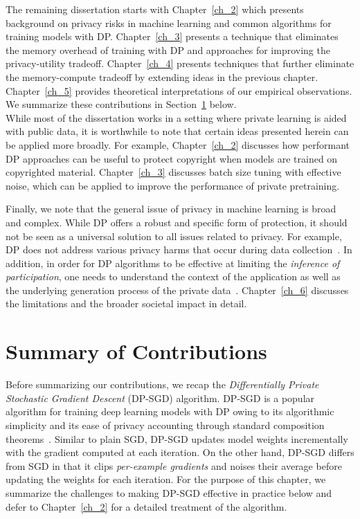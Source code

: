 The remaining dissertation starts with Chapter~\ref{ch_2} which presents background on privacy risks in machine learning and common algorithms for training models with DP.
Chapter~\ref{ch_3} presents a technique that eliminates the memory overhead of training with DP and approaches for improving the privacy-utility tradeoff.
Chapter~\ref{ch_4} presents techniques that further eliminate the memory-compute tradeoff by extending ideas in the previous chapter.
Chapter~\ref{ch_5} provides theoretical interpretations of our empirical observations.
We summarize these contributions in Section~\ref{sec:overview_of_results} below.\\

While most of the dissertation works in a setting where private learning is aided with public data, it is worthwhile to note that certain ideas presented herein can be applied more broadly. 
For example, Chapter~\ref{ch_2} discusses how performant DP approaches can be useful to protect copyright when models are trained on copyrighted material.
Chapter~\ref{ch_3} discusses batch size tuning with effective noise, which can be applied to improve the performance of private pretraining.

Finally, we note that the general issue of privacy in machine learning is broad and complex.
While DP offers a robust and specific form of protection, it should not be seen as a universal solution to all issues related to privacy.
For example, DP does not address various privacy harms that occur during data collection~\cite{solove2005taxonomy}.
In addition, in order for DP algorithms to be effective at limiting the \emph{inference of participation}, one needs to understand the context of the application as well as the underlying generation process of the private data~\cite{kifer2011no}. 
Chapter~\ref{ch_6} discusses the limitations and the broader societal impact in detail.

\section{Summary of Contributions}\label{sec:overview_of_results}

Before summarizing our contributions, we recap the \emph{Differentially Private Stochastic Gradient Descent} (DP-SGD) algorithm.
DP-SGD is a popular algorithm for training deep learning models with DP owing to its algorithmic simplicity and its ease of privacy accounting through standard composition theorems~\cite{dwork2014algorithmic}.
Similar to plain SGD, DP-SGD updates model weights incrementally with the gradient computed at each iteration.
On the other hand, DP-SGD differs from SGD in that it clips \emph{per-example gradients} and noises their average before updating the weights for each iteration. 
For the purpose of this chapter, we summarize the challenges to making DP-SGD effective in practice below and defer to Chapter~\ref{ch_2} for a detailed treatment of the algorithm. 

